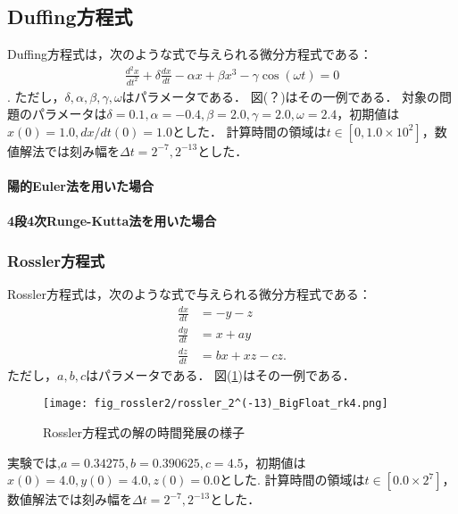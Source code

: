 \subsection{Duffing方程式}
Duffing方程式は，次のような式で与えられる微分方程式である：
\begin{align}
    \frac{d^2 x}{dt^2} + \delta\frac{dx}{dt} - \alpha x + \beta x^3 - \gamma \cos(\omega t) = 0
\end{align}.
ただし，$\delta,\alpha,\beta,\gamma,\omega$はパラメータである．
図(？)はその一例である．
対象の問題のパラメータは$\delta=0.1, \alpha=-0.4, \beta=2.0, \gamma=2.0, \omega=2.4$，初期値は$x(0) = 1.0, dx/dt(0) = 1.0$とした．
計算時間の領域は$t \in [0,1.0 \times 10^2]$，数値解法では刻み幅を$\Delta t =  2^{-7}, 2^{-13}$とした．
\paragraph*{陽的Euler法を用いた場合}

\paragraph*{4段4次Runge-Kutta法を用いた場合}

\subsubsection{Rossler方程式}
Rossler方程式は，次のような式で与えられる微分方程式である：
\begin{align}
    \frac{dx}{dt} &= -y-z \\
    \frac{dy}{dt} &= x+ay \\
    \frac{dz}{dt} &= bx + xz - cz.
\end{align}
ただし，$a,b,c$はパラメータである．
図(\ref{fig:rossler})はその一例である．
\begin{figure}[H]
    \centering
    \texttt{[image: fig\_rossler2/rossler\_2^(-13)\_BigFloat\_rk4.png]}
    \caption{Rossler方程式の解の時間発展の様子}
    \label{fig:rossler}
\end{figure}
実験では,$a=0.34275, b=0.390625, c=4.5$，初期値は$x(0) = 4.0, y(0) = 4.0, z(0) = 0.0$とした.
計算時間の領域は$t \in [0.0 \times 2^7]$，数値解法では刻み幅を$\Delta t =   2^{-7},2^{-13}$とした．
